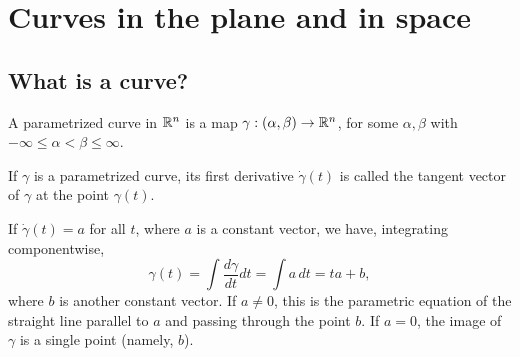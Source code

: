\section{Curves in the plane and in space}

\subsection{What is a curve?}

\begin{defn}
  A parametrized curve in $\mathbb{R}^n$
  is a map $\gamma: (\alpha, \beta) \to \mathbb{R}^n$,
  for some $\alpha, \beta$ with $-\infty \leq \alpha < \beta \leq \infty$.
\end{defn}

\begin{defn}
  If $\gamma$ is a parametrized curve, its first derivative $\dot{\gamma}(t)$
  is called the tangent vector of $\gamma$ at the point $\gamma(t)$.
\end{defn}

\begin{proposition}
  If $\dot{\gamma}(t) = a$ for all $t$, where $a$ is a constant vector,
  we have, integrating componentwise,
  \[
    \gamma(t) = \int \frac{d\gamma}{dt} dt = \int a \, dt = ta + b,
  \]
  where $b$ is another constant vector.
  If $a \neq 0$, this is the parametric equation of the straight
  line parallel to $a$ and passing through the point $b$.
  If $a = 0$, the image of $\gamma$ is a single point (namely, $b$).
\end{proposition}